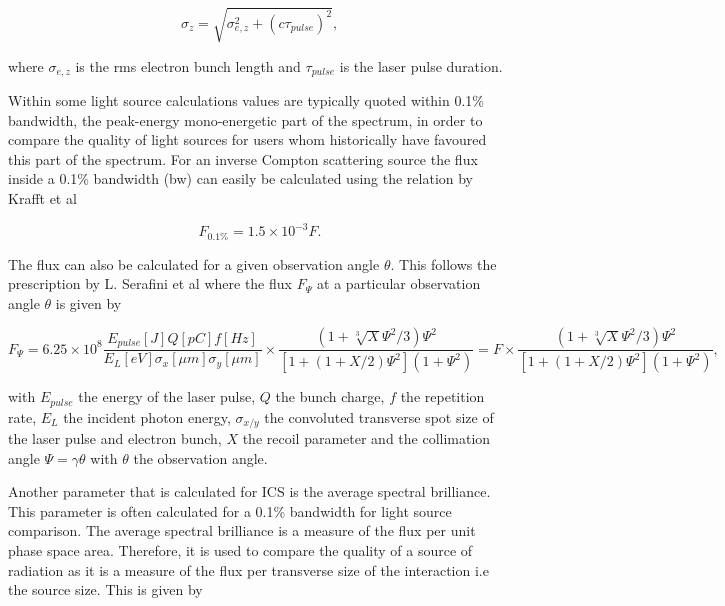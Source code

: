 \documentclass[11pt]{article}
\begin{document}
\begin{equation}
\sigma_{z} = \sqrt{\sigma^{2}_{e,z}+\left(c\tau_{pulse}\right)^{2}},
\label{eq:longconv}
\end{equation}

\noindent where $\sigma_{e,z}$ is the rms electron bunch length and $\tau_{pulse}$ is the laser pulse duration.

Within some light source calculations values are typically quoted within 0.1\% bandwidth, the peak-energy mono-energetic part of the spectrum, in order to compare the quality of light sources for users whom historically have favoured this part of the spectrum. For an inverse Compton scattering source the flux inside a 0.1\% bandwidth (bw) can easily be calculated using the relation by Krafft et al \cite{CompSourceEM}

\begin{equation}
F_{0.1\%} = 1.5\times 10^{-3} F.       
\label{eq:F0.1band}
\end{equation}

\noindent The flux can also be calculated for a given observation angle $\theta$. This follows the prescription by L. Serafini et al \cite{SerafiniAnalytical} where the flux $F_{\Psi}$ at a particular observation angle $\theta$ is given by

\begin{equation}
F_{\Psi} = 6.25\times 10^{8}\frac{E_{pulse}[J]Q[pC]f[Hz]}{E_{L}[eV]\sigma_{x}[\mu m]\sigma_{y}[\mu m]} \times \frac{\left(1+\sqrt[3]{X}\Psi^{2}/3\right)\Psi^{2}}{\left[1+\left(1+X/2\right)\Psi^{2}\right]\left(1+\Psi^{2}\right)} = F \times \frac{\left(1+\sqrt[3]{X}\Psi^{2}/3\right)\Psi^{2}}{\left[1+\left(1+X/2\right)\Psi^{2}\right]\left(1+\Psi^{2}\right)} ,
\label{eq:Fobang1}
\end{equation}

\noindent with $E_{pulse}$ the energy of the laser pulse, $Q$ the bunch charge, $f$ the repetition rate, $E_{L}$ the incident photon energy, $\sigma_{x/y}$ the convoluted transverse spot size of the laser pulse and electron bunch, $X$ the recoil parameter and the collimation angle $\Psi = \gamma\theta$ with $\theta$ the observation angle.

Another parameter that is calculated for ICS is the average spectral brilliance. This parameter is often calculated for a 0.1\% bandwidth for light source comparison. The average spectral brilliance is a measure of the flux per unit phase space area. Therefore, it is used to compare the quality of a source of radiation as it is a measure of the flux per transverse size of the interaction i.e the source size. This is given by
\end{document}
